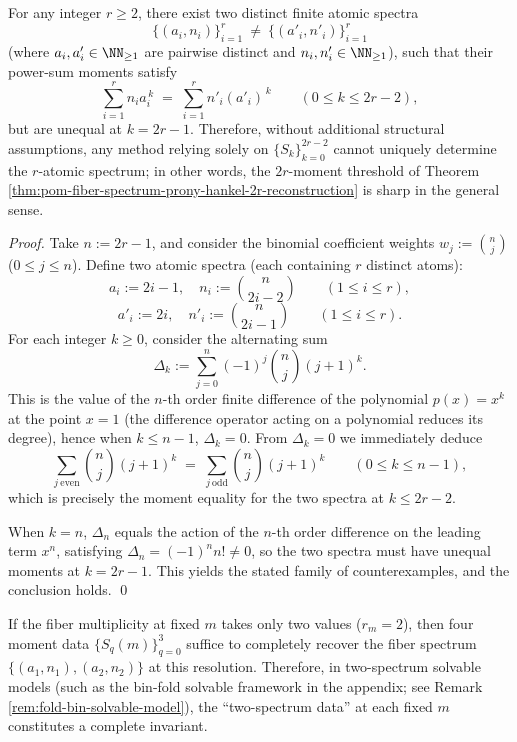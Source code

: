 \begin{theorem}\label{thm:pom-fiber-spectrum-prony-hankel-threshold-sharp}
For any integer \(r\ge 2\), there exist two distinct finite atomic spectra
\[
\{(a_i,n_i)\}_{i=1}^{r}\ \neq\ \{(a'_i,n'_i)\}_{i=1}^{r}
\]
(where \(a_i,a'_i\in\NN_{\ge 1}\) are pairwise distinct and \(n_i,n'_i\in\NN_{\ge 1}\)), such that their power-sum moments satisfy
\[
\sum_{i=1}^{r}n_i a_i^{\,k}
\;=\;
\sum_{i=1}^{r}n'_i (a'_i)^{\,k}
\qquad(0\le k\le 2r-2),
\]
but are unequal at \(k=2r-1\).
Therefore, without additional structural assumptions, any method relying solely on \(\{S_k\}_{k=0}^{2r-2}\) cannot uniquely determine the \(r\)-atomic spectrum;
in other words, the \(2r\)-moment threshold of Theorem \ref{thm:pom-fiber-spectrum-prony-hankel-2r-reconstruction} is sharp in the general sense.
\end{theorem}
\begin{proof}
Take \(n:=2r-1\), and consider the binomial coefficient weights \(w_j:=\binom{n}{j}\) (\(0\le j\le n\)).
Define two atomic spectra (each containing \(r\) distinct atoms):
\[
a_i:=2i-1,\quad n_i:=\binom{n}{2i-2}\qquad(1\le i\le r),
\]
\[
a'_i:=2i,\quad n'_i:=\binom{n}{2i-1}\qquad(1\le i\le r).
\]
For each integer \(k\ge 0\), consider the alternating sum
\[
\Delta_k:=\sum_{j=0}^{n}(-1)^j\binom{n}{j}(j+1)^k.
\]
This is the value of the \(n\)-th order finite difference of the polynomial \(p(x)=x^k\) at the point \(x=1\) (the difference operator acting on a polynomial reduces its degree), hence when \(k\le n-1\), \(\Delta_k=0\).
From \(\Delta_k=0\) we immediately deduce
\[
\sum_{j\ \mathrm{even}}\binom{n}{j}(j+1)^k
\;=\;
\sum_{j\ \mathrm{odd}}\binom{n}{j}(j+1)^k
\qquad(0\le k\le n-1),
\]
which is precisely the moment equality for the two spectra at \(k\le 2r-2\).
\par
When \(k=n\), \(\Delta_n\) equals the action of the \(n\)-th order difference on the leading term \(x^n\), satisfying \(\Delta_n=(-1)^n n!\neq 0\),
so the two spectra must have unequal moments at \(k=2r-1\).
This yields the stated family of counterexamples, and the conclusion holds. \qed
\end{proof}

\begin{corollary}\label{cor:pom-fiber-spectrum-two-atom-complete-invariant}
If the fiber multiplicity at fixed \(m\) takes only two values (\(r_m=2\)),
then four moment data \(\{S_q(m)\}_{q=0}^{3}\) suffice to completely recover the fiber spectrum \(\{(a_1,n_1),(a_2,n_2)\}\) at this resolution.
Therefore, in two-spectrum solvable models (such as the bin-fold solvable framework in the appendix; see Remark \ref{rem:fold-bin-solvable-model}),
the ``two-spectrum data'' at each fixed \(m\) constitutes a complete invariant.
\end{corollary}

